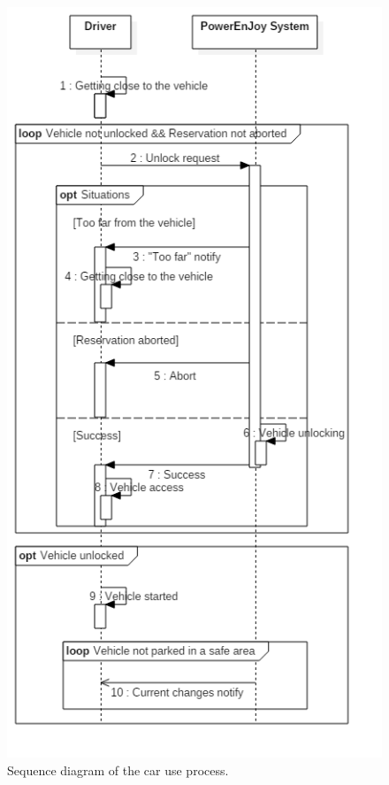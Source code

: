 \begin{figure}[H]
	\begin{center}
		\centering
		\includegraphics[height=0.9\textheight, keepaspectratio]{sequence_diagram/Unlock.png}
		\caption{Sequence diagram of the car use process.}
	\end{center}
\end{figure}


